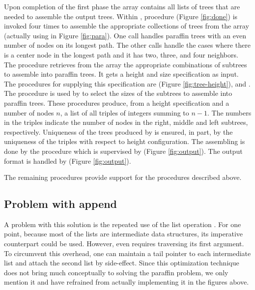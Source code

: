 Upon completion of the first phase the array  contains all lists of
trees that are needed to assemble the output trees.  Within ,
procedure  (Figure \ref{fig:done})
is invoked four times to assemble the appropriate collections of trees from
the array (actually using  in Figure \ref{fig:para}).
One call handles paraffin trees with an even number of nodes on
its longest path.  The other calls handle the cases where there is a center
node in the longest path and it has two, three, and four neighbors.  The
procedure  retrieves from the array the appropriate combinations
of subtrees to assemble into paraffin trees.  It gets a height and size
specification as input.  The procedures for supplying this specification
are  (Figure \ref{fig:tree-height}), and .
The procedure  is used by  to select
the sizes of the subtrees to assemble into paraffin trees.  These procedures
produce, from
a height specification and a number of nodes $n$, a list of all triples of
integers summing to $n-1$. The numbers in the triples indicate the number of
nodes in the right, middle and left subtrees, respectively.  Uniqueness of
the trees produced by  is ensured, in part, by the uniqueness of the
triples with respect to height configuration. The assembling is done by the
procedure  which is supervised by 
(Figure \ref{fig:output}).  The output format is handled by
 (Figure \ref{fig:output}).

The remaining procedures provide support for the procedures described above.


\subsection{Problem with append}

A problem with this solution is the repeated use of the list operation
.  For one point, because most of the lists are
intermediate data structures, its imperative counterpart
 could be used.  However, even  requires
traversing its first argument.  To circumvent this overhead, one can
maintain a tail pointer to each intermediate list and attach the
second list by side-effect.  Since this optimization technique does
not bring much conceptually to solving the paraffin problem, we only
mention it and have refrained from actually implementing it in the
figures above.


